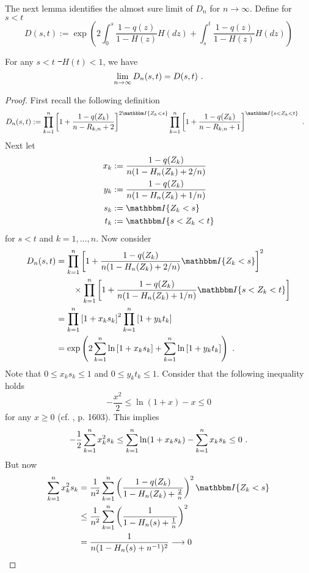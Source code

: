 %
The next lemma identifies the almost sure limit of $D_n$ for $n\to\infty$. Define for $s<t$
$$D(s,t) := \exp\left(2\int_{0}^{s} \frac{1-q(z)}{1-H(z)} H(dz) + \int_{s}^{t} \frac{1-q(z)}{1-H(z)} H(dz)\right)$$
\begin{lemma} \label{lem:dn_limit}
	For any $s < t$ \st\ $H(t)<1$, we have
	$$\lim\limits_{n\to\infty}D_n(s,t) = D(s,t)\textrm{ .}$$
	\begin{proof}
		First recall the following definition
		\begin{align*}
		D_n(s,t) &:= \prod_{k=1}^{n} \left[1+\frac{1-q(Z_k)}{n-R_{k,n} +2}\right]^{2\I{Z_k<s}} \prod_{k=1}^{n}\left[1+\frac{1-q(Z_k)}{n-R_ {k,n}+1}\right]^{\I{s < Z_k < t}} \mdot
		\end{align*}
		Next let 
		\begin{align*}
		x_k &:= \frac{1-q(Z_k)}{n(1- H_n(Z_k) + 2/n)}\\
		y_k &:= \frac{1-q(Z_k)}{n(1- H_n(Z_k) + 1/n)}\\
		s_k &:= \I{Z_k < s} \\
		t_k &:= \I{s < Z_k < t}
		\end{align*}
		for $s<t$ and $k=1,\dots,n$.
		Now consider 
		\begin{align*}
		D_n(s,t) &= \prod_{k=1}^{n} \left[1+\frac{1-q(Z_k)}{n(1- H_n(Z_k) + 2/n)}\I{Z_k<s}\right]^{2}\\ 
		&\qquad \times \prod_{k=1}^{n}\left[1+\frac{1-q(Z_k)}{n(1-H_n(Z_k)+1/n)}\I{s < Z_k < t}\right]\\
		&= \prod_{k=1}^{n} \left[1+x_k s_k\right]^{2} \prod_{k=1}^{n}\left[1+y_k t_k\right]\\
		&= \exp\left(2\sum_{k=1}^{n}\ln\left[1+x_k s_k\right] + \sum_{k=1}^{n}\ln\left[1+y_k t_k\right]\right)\mdot
		\end{align*}
		Note that $0 \leq x_k s_k \leq 1$ and $0 \leq y_k t_k \leq 1$. Consider that the following inequality holds  
		$$-\frac{x^2}{2} \leq \ln(1+x) - x \leq 0$$ 
		for any $x \geq 0$ (cf.  \cite{stute1993strong}, p. 1603). This implies 
		$$-\frac{1}{2}\sum_{k=1}^{n}x_k^2 s_k \leq \sum_{k=1}^{n}\ln(1+x_k s_k) - \sum_{k=1}^{n}x_k s_k \leq 0\textrm{ .}$$ 
		But now 
		\begin{align*}
		\sum_{k=1}^{n} x_k^2 s_k &= \frac{1}{n^2} \sum_{k=1}^{n} \left(\frac{1-q(Z_k)}{1-H_n(Z_k)+\frac{2}{n}}\right)^2\I{Z_k<s}\\
		&\leq \frac{1}{n^2} \sum_{k=1}^{n} \left(\frac{1}{1-H_n(s)+\frac{1}{n}}\right)^2\\
		&= \frac{1}{n(1-H_n(s)+n^{-1})^2} \longrightarrow 0

\end{align*}
\end{proof}
\end{lemma}
